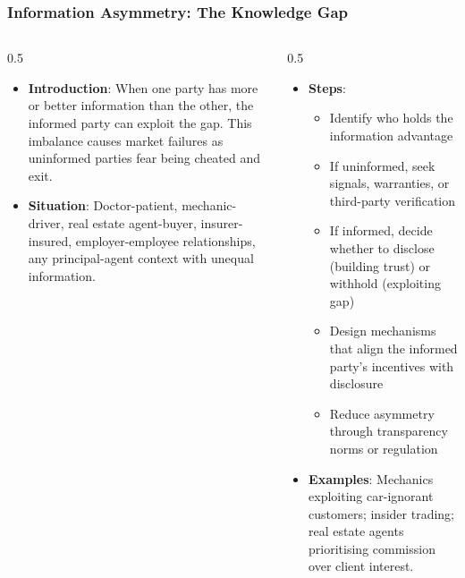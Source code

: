 \begin{frame}[fragile]\frametitle{Information Asymmetry: The Knowledge Gap}
\begin{columns}
    \begin{column}[T]{0.5\linewidth}
      \begin{itemize}
        \item \textbf{Introduction}: When one party has more or better information than the other, the informed party can exploit the gap. This imbalance causes market failures as uninformed parties fear being cheated and exit.
        \item \textbf{Situation}: Doctor-patient, mechanic-driver, real estate agent-buyer, insurer-insured, employer-employee relationships, any principal-agent context with unequal information.
      \end{itemize}
    \end{column}
    \begin{column}[T]{0.5\linewidth}
      \begin{itemize}
        \item \textbf{Steps}:
        \begin{itemize}
          \item Identify who holds the information advantage
          \item If uninformed, seek signals, warranties, or third-party verification
          \item If informed, decide whether to disclose (building trust) or withhold (exploiting gap)
          \item Design mechanisms that align the informed party's incentives with disclosure
          \item Reduce asymmetry through transparency norms or regulation
        \end{itemize}\item \textbf{Examples}: Mechanics exploiting car-ignorant customers; insider trading; real estate agents prioritising commission over client interest.
      \end{itemize}
    \end{column}
  \end{columns}
\end{frame}

